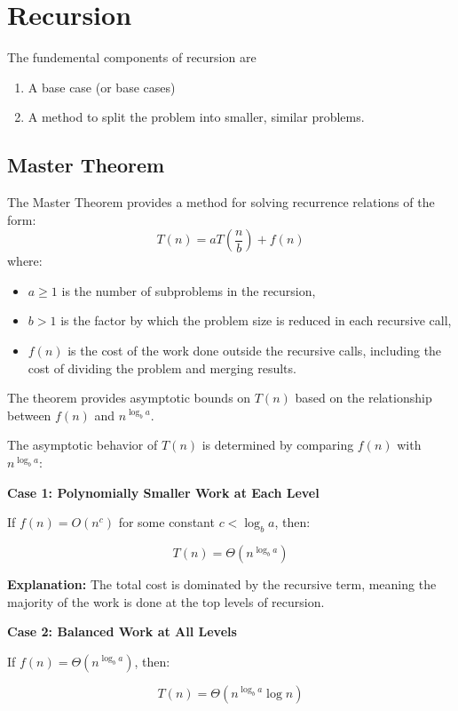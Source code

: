 \section{Recursion}

The fundemental components of recursion are
\begin{enumerate}
    \item A base case (or base cases)
    \item A method to split the problem into smaller, similar problems.
\end{enumerate}

\subsection{Master Theorem}

The Master Theorem provides a method for solving recurrence relations
of the form:
\[
    T(n) = aT\left(\frac{n}{b}\right) + f(n)
\]
where:
\begin{itemize}
    \item \( a \geq 1 \) is the number of subproblems in the recursion,
    \item \( b > 1 \) is the factor by which the problem
          size is reduced in each recursive call,
    \item \( f(n) \) is the cost of the work done outside
          the recursive calls, including the cost of dividing the problem and merging results.
\end{itemize}

The theorem provides asymptotic bounds on \( T(n) \)
based on the relationship between \( f(n) \) and \( n^{\log_b a} \).

The asymptotic behavior of \( T(n) \) is determined
by comparing \( f(n) \) with \( n^{\log_b a} \):

\textbf{Case 1: Polynomially Smaller Work at Each Level}

If \( f(n) = O(n^c) \) for some constant \( c < \log_b a \), then:

\[
    T(n) = \Theta(n^{\log_b a})
\]

\textbf{Explanation:} The total cost is dominated by the recursive term, meaning the majority of the work is done at the top levels of recursion.

\textbf{Case 2: Balanced Work at All Levels}

If \( f(n) = \Theta(n^{\log_b a}) \), then:

\[
    T(n) = \Theta(n^{\log_b a} \log n)
\]


